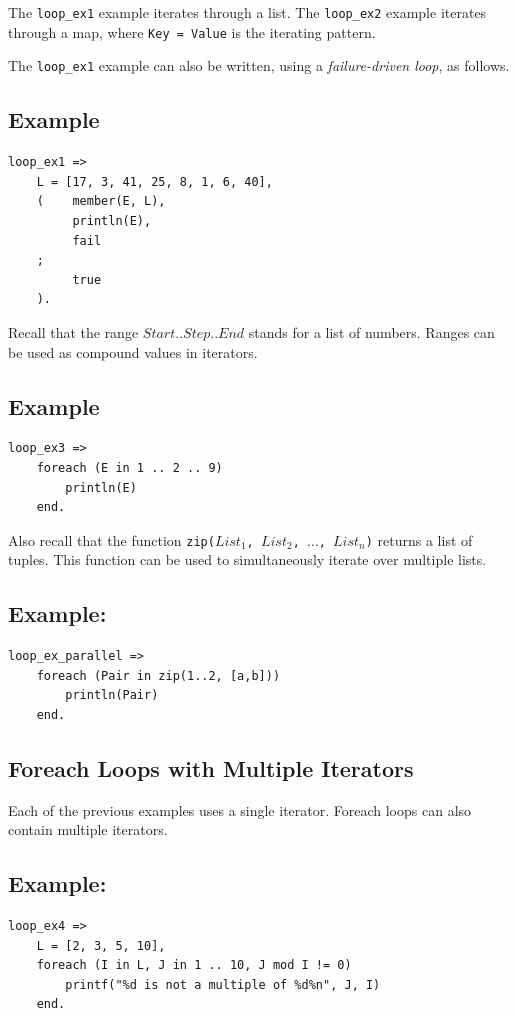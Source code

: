 The \texttt{loop\_ex1} example iterates through a list.  The \texttt{loop\_ex2} example iterates through a map, where \texttt{Key = Value} is the iterating pattern.

The \texttt{loop\_ex1} example can also be written, using a \emph{failure-driven loop}, as follows.

\subsection*{Example}
\begin{verbatim}
loop_ex1 =>
    L = [17, 3, 41, 25, 8, 1, 6, 40],
    (    member(E, L),
         println(E),
         fail
    ;
         true
    ).
\end{verbatim}


Recall that the range $Start .. Step .. End$ stands for a list of numbers.  Ranges can be used as compound values in iterators.
\subsection*{Example}
\begin{verbatim}
loop_ex3 =>
    foreach (E in 1 .. 2 .. 9)
        println(E)
    end.
\end{verbatim}

Also recall that the function \texttt{zip($List_1$, $List_2$, $\ldots$, $List_n$)} returns a list of tuples. This function can be used to simultaneously iterate over multiple lists.

\subsection*{Example:}
\begin{verbatim}
loop_ex_parallel =>
    foreach (Pair in zip(1..2, [a,b]))
        println(Pair)
    end.
\end{verbatim}


\subsection{Foreach Loops with Multiple Iterators}
Each of the previous examples uses a single iterator.  Foreach loops can also contain multiple iterators.
\subsection*{Example:}
\begin{verbatim}
loop_ex4 =>
    L = [2, 3, 5, 10],
    foreach (I in L, J in 1 .. 10, J mod I != 0)
        printf("%d is not a multiple of %d%n", J, I)
    end.
\end{verbatim}

